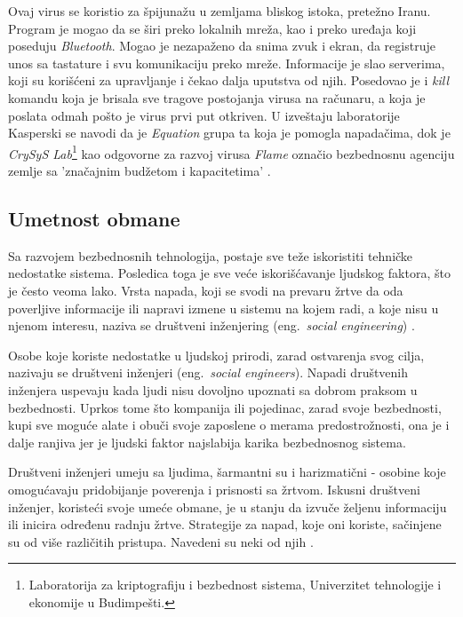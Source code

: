 \documentclass[a4paper]{article}
\begin{document}
Ovaj virus se koristio za špijunažu u zemljama bliskog istoka, pretežno Iranu. Program je mogao da se širi preko lokalnih mreža, kao i preko uređaja koji poseduju {\em Bluetooth}. Mogao je nezapaženo da snima zvuk i ekran, da registruje unos sa tastature i svu komunikaciju preko mreže. Informacije je slao serverima, koji su korišćeni za upravljanje i čekao dalja uputstva od njih. Posedovao je i \textit{kill} komandu koja je brisala sve tragove postojanja virusa na računaru, a koja je poslata odmah pošto je virus prvi put otkriven. U izveštaju laboratorije Kasperski se navodi da je \textit{Equation} grupa ta koja je pomogla napadačima, dok je \textit{CrySyS Lab}\footnote{ Laboratorija za kriptografiju i bezbednost sistema, Univerzitet tehnologije i ekonomije u Budimpešti.} kao odgovorne za razvoj virusa \textit{Flame} označio bezbednosnu agenciju zemlje sa 'značajnim budžetom i kapacitetima' \cite{flame}.

\subsection{Umetnost obmane}
\label{deception}

Sa razvojem bezbednosnih tehnologija, postaje sve teže
iskoristiti tehničke nedostatke sistema.
Posledica toga je sve veće iskorišćavanje ljudskog
faktora, što je često veoma lako. Vrsta napada, koji se
svodi na prevaru žrtve da oda poverljive informacije ili
napravi izmene u sistemu na kojem radi, a koje nisu u
njenom interesu, naziva se društveni inženjering
(eng.~{\em social engineering}) \cite{deception}.

Osobe koje koriste nedostatke u ljudskoj prirodi, zarad ostvarenja svog cilja, nazivaju se društveni inženjeri (eng.~{\em social engineers}). Napadi društvenih inženjera uspevaju kada ljudi nisu dovoljno upoznati sa dobrom praksom u bezbednosti. Uprkos tome što kompanija ili pojedinac, zarad svoje bezbednosti, kupi sve moguće alate i obuči svoje zaposlene o merama predostrožnosti, ona je i dalje ranjiva jer je ljudski faktor najslabija karika bezbednosnog sistema.

Društveni inženjeri umeju sa ljudima, šarmantni su i harizmatični - osobine koje omogućavaju pridobijanje poverenja i prisnosti sa žrtvom. Iskusni društveni inženjer, koristeći svoje umeće obmane, je u stanju da izvuče željenu informaciju ili inicira određenu radnju žrtve. Strategije za napad, koje oni koriste, sačinjene su od više različitih pristupa. Navedeni su neki od njih \cite{deception}.
\end{document}
